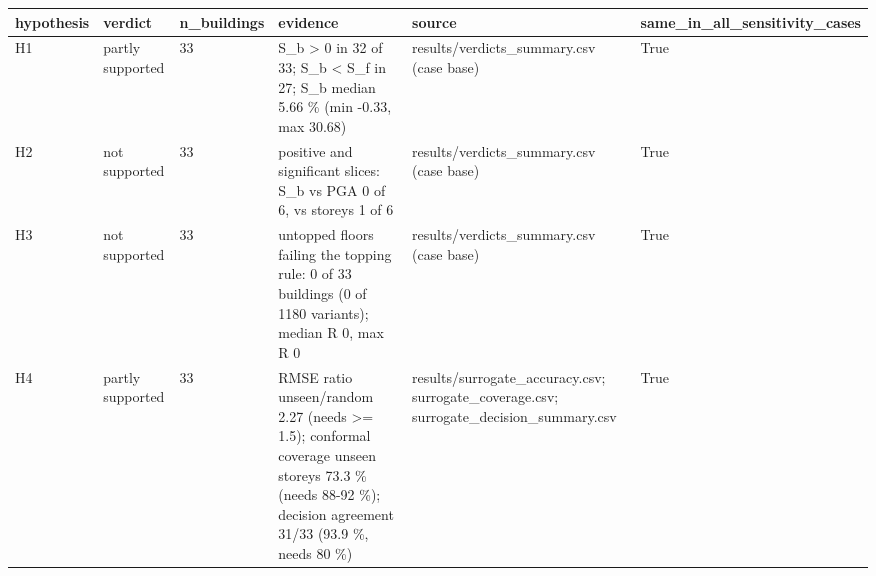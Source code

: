 \begin{tabular}{llllll}
\toprule
hypothesis & verdict & n\_buildings & evidence & source & same\_in\_all\_sensitivity\_cases \\
\midrule
H1 & partly supported & 33 & S\_b > 0 in 32 of 33; S\_b < S\_f in 27; S\_b median 5.66 \% (min -0.33, max 30.68) & results/verdicts\_summary.csv (case base) & True \\
H2 & not supported & 33 & positive and significant slices: S\_b vs PGA 0 of 6, vs storeys 1 of 6 & results/verdicts\_summary.csv (case base) & True \\
H3 & not supported & 33 & untopped floors failing the topping rule: 0 of 33 buildings (0 of 1180 variants); median R 0, max R 0 & results/verdicts\_summary.csv (case base) & True \\
H4 & partly supported & 33 & RMSE ratio unseen/random 2.27 (needs >= 1.5); conformal coverage unseen storeys 73.3 \% (needs 88-92 \%); decision agreement 31/33 (93.9 \%, needs 80 \%) & results/surrogate\_accuracy.csv; surrogate\_coverage.csv; surrogate\_decision\_summary.csv & True \\
\bottomrule
\end{tabular}
